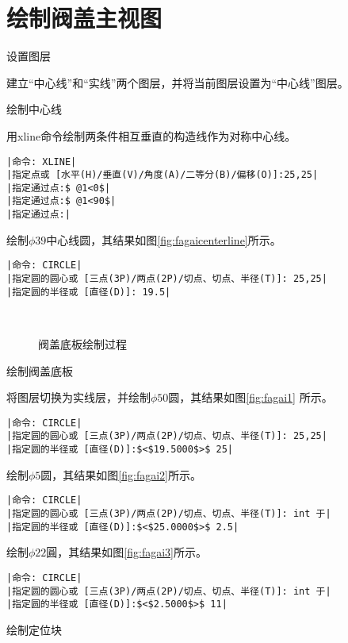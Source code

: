 \section{绘制阀盖主视图}
\begin{procedure}
\item 设置图层

建立“中心线”和“实线”两个图层，并将当前图层设置为“中心线”图层。
\item 绘制中心线

用xline命令绘制两条件相互垂直的构造线作为对称中心线。
\begin{lstlisting}
|命令: XLINE|
|指定点或 [水平(H)/垂直(V)/角度(A)/二等分(B)/偏移(O)]:25,25|
|指定通过点:$ @1<0$|
|指定通过点:$ @1<90$|
|指定通过点:|
\end{lstlisting}
绘制$\phi 39$中心线圆，其结果如图\ref{fig:fagaicenterline}所示。
\begin{lstlisting}
|命令: CIRCLE|
|指定圆的圆心或 [三点(3P)/两点(2P)/切点、切点、半径(T)]: 25,25|
|指定圆的半径或 [直径(D)]: 19.5|
\end{lstlisting}
\begin{figure}[htbp]
\centering
{}\hspace{30pt}
\\
\hspace{30pt}
\caption{阀盖底板绘制过程}
\end{figure}
\item 绘制阀盖底板

将图层切换为实线层，并绘制$\phi 50$圆，其结果如图\ref{fig:fagai1} 所示。
\begin{lstlisting}
|命令: CIRCLE|
|指定圆的圆心或 [三点(3P)/两点(2P)/切点、切点、半径(T)]: 25,25|
|指定圆的半径或 [直径(D)]:$<$19.5000$>$ 25|
\end{lstlisting}
绘制$\phi 5$圆，其结果如图\ref{fig:fagai2}所示。
\begin{lstlisting}
|命令: CIRCLE|
|指定圆的圆心或 [三点(3P)/两点(2P)/切点、切点、半径(T)]: int 于|
|指定圆的半径或 [直径(D)]:$<$25.0000$>$ 2.5|
\end{lstlisting}
绘制$\phi 22$圓，其结果如图\ref{fig:fagai3}所示。
\begin{lstlisting}
|命令: CIRCLE|
|指定圆的圆心或 [三点(3P)/两点(2P)/切点、切点、半径(T)]: int 于|
|指定圆的半径或 [直径(D)]:$<$2.5000$>$ 11|
\end{lstlisting}
\item 绘制定位块


\end{procedure}
